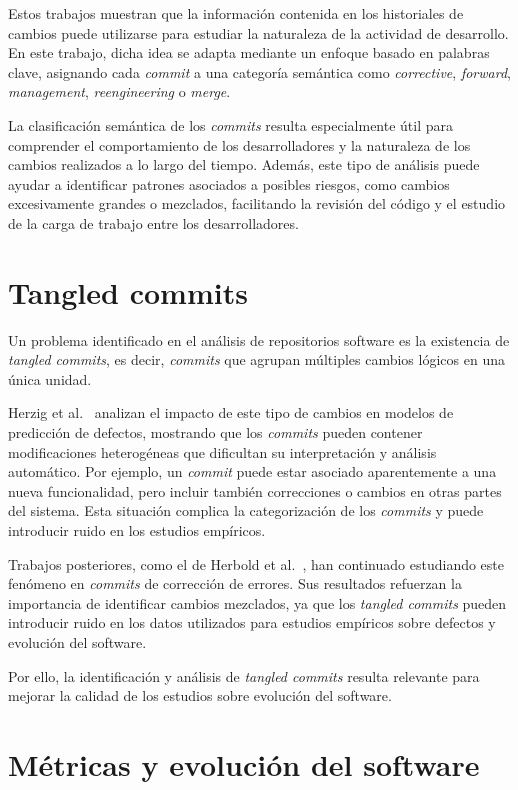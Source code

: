 \documentclass[a4paper, 12pt]{book}
\begin{document}
Estos trabajos muestran que la información contenida en los historiales de cambios puede utilizarse para estudiar la naturaleza de la actividad de desarrollo. En este trabajo, dicha idea se adapta mediante un enfoque basado en palabras clave, asignando cada \emph{commit} a una categoría semántica como \emph{corrective}, \emph{forward}, \emph{management}, \emph{reengineering} o \emph{merge}.

La clasificación semántica de los \emph{commits} resulta especialmente útil para comprender el comportamiento de los desarrolladores y la naturaleza de los cambios realizados a lo largo del tiempo. Además, este tipo de análisis puede ayudar a identificar patrones asociados a posibles riesgos, como cambios excesivamente grandes o mezclados, facilitando la revisión del código y el estudio de la carga de trabajo entre los desarrolladores.


\section{Tangled commits}
\label{sec:tangled}

Un problema identificado en el análisis de repositorios software es la existencia de \emph{tangled commits}, es decir, \emph{commits} que agrupan múltiples cambios lógicos en una única unidad.

Herzig et al.~\cite{herzig2013impact} analizan el impacto de este tipo de cambios en modelos de predicción de defectos, mostrando que los \emph{commits} pueden contener modificaciones heterogéneas que dificultan su interpretación y análisis automático. Por ejemplo, un \emph{commit} puede estar asociado aparentemente a una nueva funcionalidad, pero incluir también correcciones o cambios en otras partes del sistema. Esta situación complica la categorización de los \emph{commits} y puede introducir ruido en los estudios empíricos.

Trabajos posteriores, como el de Herbold et al.~\cite{herbold2022tangling}, han continuado estudiando este fenómeno en \emph{commits} de corrección de errores. Sus resultados refuerzan la importancia de identificar cambios mezclados, ya que los \emph{tangled commits} pueden introducir ruido en los datos utilizados para estudios empíricos sobre defectos y evolución del software.

Por ello, la identificación y análisis de \emph{tangled commits} resulta relevante para mejorar la calidad de los estudios sobre evolución del software.

\section{Métricas y evolución del software}
\label{sec:metricas}
\end{document}
